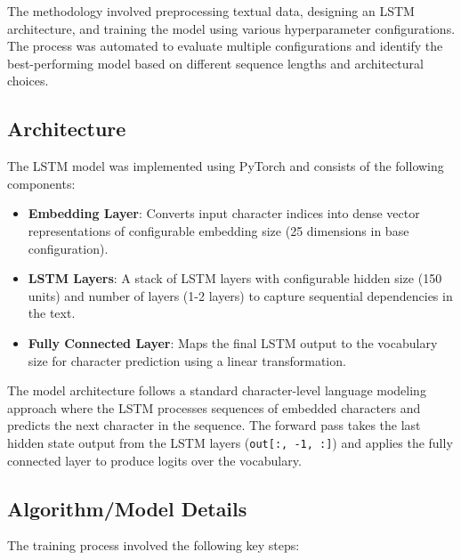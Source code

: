 \documentclass[12pt]{article}
\begin{document}
The methodology involved preprocessing textual data, designing an LSTM architecture, and training the model using various hyperparameter configurations. The process was automated to evaluate multiple configurations and identify the best-performing model based on different sequence lengths and architectural choices.

\subsection{Architecture}
The LSTM model was implemented using PyTorch and consists of the following components:

\begin{itemize}
    \item \textbf{Embedding Layer}: Converts input character indices into dense vector representations of configurable embedding size (25 dimensions in base configuration).
    \item \textbf{LSTM Layers}: A stack of LSTM layers with configurable hidden size (150 units) and number of layers (1-2 layers) to capture sequential dependencies in the text.
    \item \textbf{Fully Connected Layer}: Maps the final LSTM output to the vocabulary size for character prediction using a linear transformation.
\end{itemize}

The model architecture follows a standard character-level language modeling approach where the LSTM processes sequences of embedded characters and predicts the next character in the sequence. The forward pass takes the last hidden state output from the LSTM layers (\texttt{out[:, -1, :]}) and applies the fully connected layer to produce logits over the vocabulary.

\subsection{Algorithm/Model Details}
The training process involved the following key steps:
\end{document}
